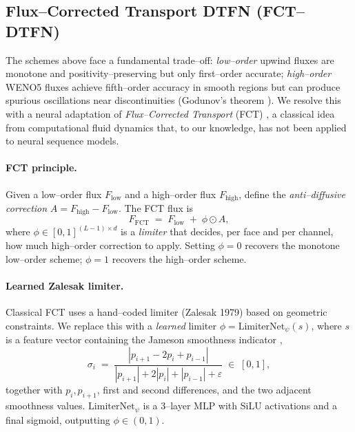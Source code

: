 \documentclass[10pt]{article}
\theoremstyle{definition}
\theoremstyle{remark}
\begin{document}
\subsection{Flux--Corrected Transport DTFN (FCT--DTFN)}
\label{sec:fct}

\newcommand{\Flow}{F_{\mathrm{low}}}
\newcommand{\Fhigh}{F_{\mathrm{high}}}

The schemes above face a fundamental trade--off: \emph{low--order}
upwind fluxes are monotone and positivity--preserving but only
first--order accurate; \emph{high--order} WENO5 fluxes achieve
fifth--order accuracy in smooth regions but can produce spurious
oscillations near discontinuities (Godunov's theorem
\cite{godunov1959difference}).  We resolve
this with a neural adaptation of \emph{Flux--Corrected Transport}
(FCT) \cite{boris1973fct,zalesak1979fct}, a classical idea from
computational fluid dynamics that, to our knowledge, has not been
applied to neural sequence models.

\paragraph{FCT principle.}
Given a low--order flux $\Flow$ and a high--order flux $\Fhigh$, define
the \emph{anti--diffusive correction} $A = \Fhigh - \Flow$.  The FCT
flux is
\begin{equation}
  F_{\mathrm{FCT}} \;=\; \Flow \;+\; \phi \odot A,
  \label{eq:fct}
\end{equation}
where $\phi \in [0,1]^{(L-1)\times d}$ is a \emph{limiter} that
decides, per face and per channel, how much high--order correction to
apply.  Setting $\phi = 0$ recovers the monotone low--order scheme;
$\phi = 1$ recovers the high--order scheme.

\paragraph{Learned Zalesak limiter.}
Classical FCT uses a hand--coded limiter (Zalesak 1979) based on
geometric constraints.  We replace this with a \emph{learned} limiter
$\phi = \mathrm{LimiterNet}_\psi(s)$, where $s$ is a feature vector
containing the Jameson smoothness indicator
\cite{jameson1995analysis},
\begin{equation}
  \sigma_i \;=\; \frac{|p_{i+1} - 2 p_i + p_{i-1}|}
                    {|p_{i+1}| + 2|p_i| + |p_{i-1}| + \varepsilon}
  \;\in\; [0,1],
\end{equation}
together with $p_i, p_{i+1}$, first and second differences, and the
two adjacent smoothness values.  $\mathrm{LimiterNet}_\psi$ is a
3--layer MLP with SiLU activations and a final sigmoid, outputting
$\phi \in (0,1)$.
\end{document}

